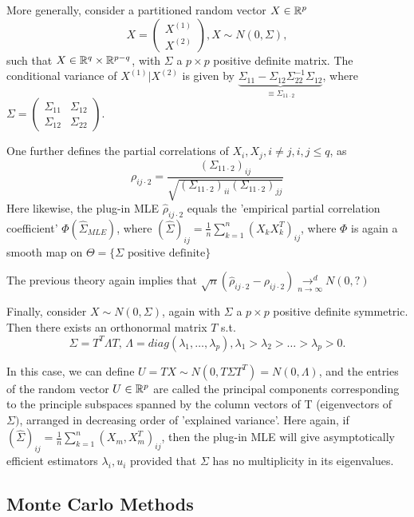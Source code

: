 \documentclass[a4paper]{article}
\begin{document}
More generally, consider a partitioned random vector $X \in \mathbb{R}^{p}$ 
\[
	X = \begin{pmatrix} X^{(1)} \\ X^{(2)} \end{pmatrix}, X\sim N(0, \Sigma)
	,\] such that $X \in \mathbb{R}^{q} \times \mathbb{R} ^{p-q}$, with $\Sigma$ a $p\times p$ positive definite matrix. The conditional variance of $X^{(1)} | X^{(2)}$ is given by $\underbrace{\Sigma_{11} - \Sigma_{12}\Sigma_{22}^{-1}\Sigma_{12}}_{\equiv \Sigma_{11\cdot 2}}$, where $\Sigma = \begin{pmatrix} \Sigma_{11} & \Sigma_{12} \\ \Sigma_{12} & \Sigma_{22} \end{pmatrix} $.

One further defines the partial correlations of $X_i, X_j, i\neq j, i,j \le q$, as
\[
	\rho_{ij\cdot 2} = \frac{\left(\Sigma_{11\cdot 2}\right)_{ij}}{\sqrt{\left(\Sigma_{11\cdot 2}\right)_{ii} \left( \Sigma_{11\cdot 2} \right)_{jj} } }
\] 
Here likewise, the plug-in MLE $\hat{\rho}_{ij\cdot 2}$ equals the 'empirical partial correlation coefficient' $\Phi(\hat{\Sigma}_{MLE})$, where $\left( \hat{\Sigma} \right)_{ij} = \frac{1}{n}\sum_{k=1}^{n} (X_k X_k^{T})_{ij}$, where $\Phi$ is again a smooth map on $\Theta = \{\Sigma \text{ positive definite}\} $

The previous theory again implies that $\sqrt{n}(\hat{\rho}_{ij\cdot 2} - \rho_{ij\cdot 2}) \underset{n\to \infty}{\to ^{d}} N(0,?)$

Finally, consider $X \sim N(0, \Sigma)$, again with $\Sigma$ a $p\times p$ positive definite symmetric. Then there exists an orthonormal matrix $T$ s.t.
\[
	\Sigma = T^{T}\Lambda T \text{, } \Lambda = diag(\lambda_1, \ldots, \lambda_p), \lambda_1 >  \lambda_2 > \ldots > \lambda_p > 0.
\] 

In this case, we can define $U = TX \sim N(0, T\Sigma T^{T}) = N(0, \Lambda)$, and the entries of the random vector $U\in \mathbb{R}^{p}$ are called the principal components corresponding to the principle subspaces spanned by the column vectors of T (eigenvectors of  $\Sigma)$, arranged in decreasing order of 'explained variance'. Here again, if $\left( \hat{\Sigma} \right)_{ij} = \frac{1}{n} \sum_{k=1}^{n}(X_m, X_m^{T})_{ij} $, then the plug-in MLE will give asymptotically efficient estimators $ \lambda_i, u_i$ provided that $\Sigma$ has no multiplicity in its eigenvalues. 

\subsection{Monte Carlo Methods}
\end{document}
